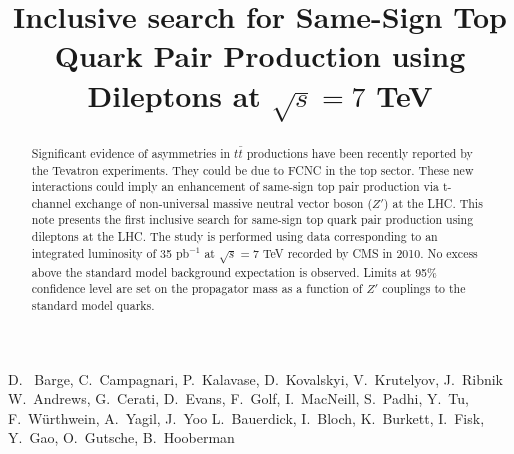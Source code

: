 \documentclass{cmspaper}
\begin{document}
%
\begin{titlepage}
\title{Inclusive search for Same-Sign Top Quark Pair Production using Dileptons at $\sqrt{s} = 7 $ TeV}

  \begin{Authlist}
    D.~ Barge, C.~Campagnari, P.~Kalavase, D.~Kovalskyi, V.~Krutelyov, J.~Ribnik
    W.~Andrews, G.~Cerati, D.~Evans, F.~Golf, I.~MacNeill, S.~Padhi, Y.~Tu, F.~W\"urthwein, A.~Yagil, J.~Yoo
    L.~Bauerdick, I.~Bloch, K.~Burkett, I.~Fisk, Y.~Gao, O.~Gutsche, B.~Hooberman
  \end{Authlist}

\begin{abstract}
Significant evidence of asymmetries in $t\bar{t}$ productions have been recently 
reported by the Tevatron experiments.   They could be due to FCNC in the top
sector.  These new interactions
could imply an enhancement of  same-sign top pair production via 
t-channel exchange of non-universal 
massive neutral vector boson ($Z'$) at the LHC. 
This note presents the first inclusive search for same-sign top quark 
pair production using dileptons at the LHC. 
The study is performed using data corresponding to an integrated luminosity 
of 35 pb$^{-1}$ at $\sqrt{s} = 7 $ TeV recorded  by CMS in 2010. 
No excess above the standard model background expectation is observed. 
Limits at 95\% confidence level are set 
on the propagator mass as a function of $Z'$ couplings to the standard model quarks. 
\end{abstract}
\end{titlepage}





\clearpage

\end{document}
